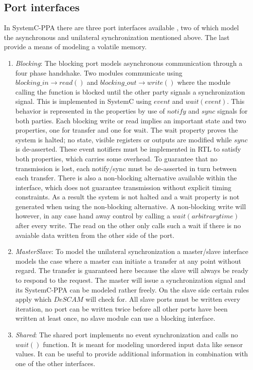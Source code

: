 \subsection{Port interfaces}
\label{sub:ports}       
In SystemC-PPA there are three port interfaces available \cite{descam}, two of which model the asynchronous and unilateral synchronization mentioned above. The last provide a means of modeling a volatile memory. 

\begin{enumerate}
 \item \textit{Blocking}: The blocking port models asynchronous communication through a four phase handshake. 
 Two modules communicate using $blocking\_in\rightarrow read()$ and $blocking\_out\rightarrow write()$ where the module calling the function is blocked until the other party signals a synchronization signal. 
 This is implemented in SystemC using $event$ and $wait(event)$. This behavior is represented in the properties by use of $notify$ and $sync$ signals for both parties. 
 Each blocking write or read implies an important state and two properties, one for transfer and one for wait. The wait property proves the system is halted; no state, 
 visible registers or outputs are modified while $sync$ is de-asserted. These event notifiers must be implemented in RTL to satisfy both properties, which carries some overhead. 
 To guarantee that no transmission is lost, each notify/sync must be de-asserted in turn between each transfer. There is also a non-blocking alternative available within the interface, 
 which does not guarantee transmission without explicit timing constraints. As a result the system is not halted and a wait property is not generated when using the non-blocking alternative.
  A non-blocking write will however, in any case hand away control by calling a $wait(arbitrary time)$ after every write. The read on the other only calls such a wait if there is no avaiable data written from the other side of the port.  
 \item \textit{MasterSlave}: To model the unilateral synchronization a master/slave interface models the case where a master can initiate a transfer at any point without regard. The transfer is guaranteed here because the slave will always be ready to respond to the request. The master will issue a synchronization signal and its SystemC-PPA can be modeled rather freely. On the slave side certain rules apply which $DeSCAM$ will check for. All slave ports must be written every iteration, no port can be written twice before all other ports have been written at least once, no slave module can use a blocking interface.
 \item \textit{Shared}: The shared port implements no event synchronization and calls no $wait()$ function. It is meant for modeling unordered input data like sensor values. It can be useful to provide additional information in combination with one of the other interfaces.   
\end{enumerate} 

